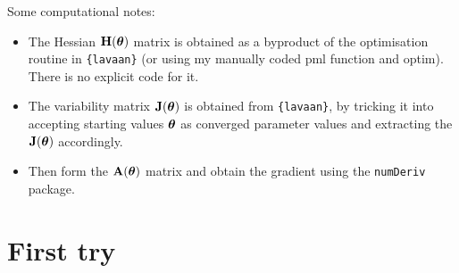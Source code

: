 \documentclass[
]{article}
\providecommand{\tightlist}{%
  \setlength{\itemsep}{0pt}\setlength{\parskip}{0pt}}
\begin{document}
Some computational notes:

\begin{itemize}
\tightlist
\item
  The Hessian \({\mathbf H}({\boldsymbol\theta})\) matrix is obtained as a byproduct of the
  optimisation routine in \texttt{\{lavaan\}} (or using my manually
  coded pml function and optim). There is no explicit code for it.
\item
  The variability matrix \({\mathbf J}({\boldsymbol\theta})\) is obtained from
  \texttt{\{lavaan\}}, by tricking it into accepting starting values
  \({\boldsymbol\theta}\) as converged parameter values and extracting the
  \({\mathbf J}({\boldsymbol\theta})\) accordingly.
\item
  Then form the \({\mathbf A}({\boldsymbol\theta})\) matrix and obtain the gradient using
  the \texttt{numDeriv} package.
\end{itemize}

\hypertarget{first-try}{%
\section{First try}\label{first-try}}
\end{document}
